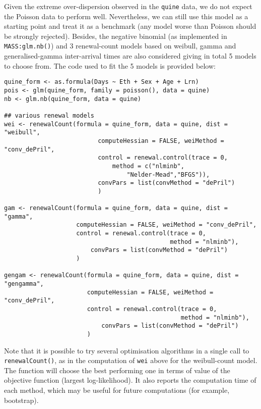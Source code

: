 \documentclass[a4paper,twoside,11pt]{article}
\begin{document}
Given the extreme over-dispersion observed in the \texttt{quine} data, we do not expect
the Poisson data to perform well. Nevertheless, we can still use this model as a
starting point and treat it as a benchmark (any model worse than Poisson should
be strongly rejected). Besides, the negative binomial (as implemented in
\texttt{MASS:glm.nb()}) and 3 renewal-count models based on weibull, gamma and
generalised-gamma inter-arrival times are also considered giving in total 5
models to choose from. The code used to fit the 5 models is provided below:
\begin{verbatim}
quine_form <- as.formula(Days ~ Eth + Sex + Age + Lrn)
pois <- glm(quine_form, family = poisson(), data = quine)
nb <- glm.nb(quine_form, data = quine)

## various renewal models
wei <- renewalCount(formula = quine_form, data = quine, dist = "weibull",
                          computeHessian = FALSE, weiMethod = "conv_dePril",
                          control = renewal.control(trace = 0,
                              method = c("nlminb", 
                                  "Nelder-Mead","BFGS")),
                          convPars = list(convMethod = "dePril")
                          )

gam <- renewalCount(formula = quine_form, data = quine, dist = "gamma",
                    computeHessian = FALSE, weiMethod = "conv_dePril",
                    control = renewal.control(trace = 0,
                                              method = "nlminb"),
                        convPars = list(convMethod = "dePril")
                    )

gengam <- renewalCount(formula = quine_form, data = quine, dist = "gengamma",
                       computeHessian = FALSE, weiMethod = "conv_dePril",
                       control = renewal.control(trace = 0,
                                                 method = "nlminb"),
                           convPars = list(convMethod = "dePril")
                       )
\end{verbatim}

Note that it is possible to try several optimisation algorithms in a single call to
\texttt{renewalCount()}, as in the computation of \texttt{wei} above  for the weibull-count model. 
The function will choose the best performing one in terms of
value of the objective function (largest log-likelihood). It also reports the
computation time  of each method, which may be useful for future computations
(for example, bootstrap).
\end{document}
